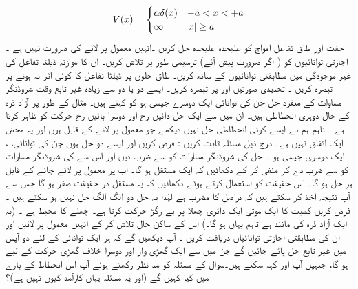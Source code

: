 \begin{align*}
V(x)=
\begin{cases}
\alpha\delta (x)& -a< x< +a\\
\infty &\abs{x}\ge a
\end{cases}
 \end{align*} 
 جفت اور طاق تفاعل امواج کو علیحدہ علیحدہ حل کریں ۔انہیں معمول پر لانے کی ضرورت نہیں ہے ۔ اجازتی توانائیوں کو ( اگر ضرورت  پیش آئے)  ترسیمی طور پر تلاش کریں۔ ان کا موازنہ ڈیلٹا تفاعل کی غیر موجودگی میں مطابقتی  توانائیوں کے ساتھ کریں۔  طاق حلوں پر   ڈیلٹا تفاعل کا کوئی اثر نہ ہونے پر تبصرہ کریں ۔ تحدیدی صورتیں   اور پر  تبصرہ کریں۔ 
 ایسے دو یا دو سے زیادہ  غیر تابع وقت  شروڈنگر  مساوات کے منفرد  حل جن کی توانائی  ایک دوسرے جیسی ہو  کو  کہتے ہیں۔ مثال کے طور پر آزاد ذرہ  کے حال  دوہری انحطاطی ہیں۔  ان میں سے ایک حل دائیں رخ اور دوسرا بائیں رخ حرکت کو ظاہر کرتا ہے ۔  تاہم  ہم نے ایسے کوئی انحطاطی حل نہیں دیکھے جو معمول پر لانے کے قابل ہوں اور یہ محض ایک اتفاق نہیں ہے۔ 
 درج ذیل مسئلہ ثابت کریں : 
  فرض کریں
  اور  ایسے دو حل ہوں جن کی توانائی،  ،   ایک دوسری  جیسی ہو ۔  حل  کی شروڈنگر  مساوات کو  سے  ضرب دیں اور اس سے کی  شروڈنگر مساوات کو  سے ضرب دے کر منفی کر کے  دکھائیں کہ  ایک مستقل ہو گا۔
 اب    پر     معمول پر لائے جانے کے  قابل ہر حل     ہو گا۔  اس حقیقت کو استعمال کرتے ہوئے دکھائیں کہ یہ مستقل در حقیقت صفر ہو گا جس سے آپ   نتیجہ اخذ کر سکتے ہیں کہ  دراصل  کا مضرب ہے   لہٰذا یہ  حل دو  الگ الگ حل  نہیں ہو سکتے ہیں ۔
فرض کریں کمیت   کا ایک موتی  ایک دائری چھلا  پر  بے رگڑ حرکت کرتا ہے۔ چھلے کا محیط  ہے ۔ (یہ ایک آزاد ذرہ کی مانند  ہے تاہم یہاں ہو گا۔)   اس کے ساکن حال تلاش کر کے  انہیں معمول پر لائیں اور ان کی  مطابقتی  اجازتی  توانائیاں دریافت  کریں ۔  آپ دیکھیں گے کہ ہر ایک توانائی کے لئے دو آپس میں غیر تابع حل پائے جائیں گے جن میں سے ایک گھڑی وار اور دوسرا خلاف گھڑی حرکت کے لیے ہو گا،  جنہیں آپ اور  کہہ سکتے ہیں۔سوال  کے مسئلہ  کو مد نظر رکھتے ہوئے آپ اس  انحطاط کے بارے میں کیا کہیں گے  (اور یہ مسئلہ یہاں کارآمد کیوں نہیں ہے)؟  

